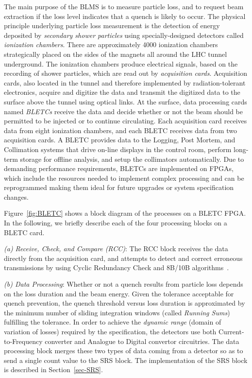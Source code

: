 \documentclass{llncs}
\begin{document}
The main purpose of the BLMS is to measure particle loss, and to request beam extraction if the loss level indicates that a quench is likely to occur.
The physical principle underlying particle loss measurement \cite{Dehning-IPAC,Chris-FPGA} is the detection of energy deposited by \emph{secondary shower particles} using specially-designed detectors called  \emph{ionization chambers}.
There are approximately 4000 ionization chambers strategically placed on the sides of the magnets all around the LHC tunnel underground.
The ionization chambers produce electrical signals, based on the recording of shower particles, which are read out by \emph{acquisition cards}.
Acquisition cards, also located in the tunnel and therefore implemented by radiation-tolerant electronics, acquire and digitize the data and transmit the digitized data to the surface above the tunnel using optical links.
At the surface, data processing cards named \emph{BLETCs} receive the data and decide whether or not the beam should be permitted to be injected or to continue circulating.
Each acquisition card receives data from eight ionization chambers, and each BLETC receives data from two acquisition cards.
A BLETC provides data to the Logging, Post Mortem, and Collimation systems that drive on-line displays in the control room, perform long-term storage for offline analysis, and setup the collimators automatically.
Due to demanding performance requirements, BLETCs are implemented on FPGAs, which include the resources needed to implement complex processing and can be reprogrammed making them ideal for future upgrades or system specification changes.

Figure~\ref{fig:BLETC} shows a block diagram of the processes on a BLETC FPGA.
In the following, we briefly describe each of the four processing blocks on a BLETC card.

\emph{(a) Receive, Check, and Compare (RCC)}: The RCC block receives the data directly from the acquisition card, and attempts to detect and correct erroneous transmissions by using Cyclic Redundancy Check and 8B/10B algorithms~\cite{CRC,8B10B}.

\emph{(b) Data Processing}: Whether or not a quench results from particle loss depends on the loss duration and the beam energy.
Given the tolerance acceptable for quench prevention, the quench threshold versus loss duration is approximated by the minimum number of sliding integration windows (called \emph{Running Sums}) fulfilling the tolerance.
In order to achieve the \emph{dynamic range} (domain of variation of losses) required by the specification, the detectors use both Current-to-Frequency converter and Analogue to Digital convertor circuitries.
The data processing block merges these two types of data coming from a detector so as to send a single count value to the SRS block.
The implementation of the SRS block is described in Section~\ref{sec-SRS}.
\end{document}
